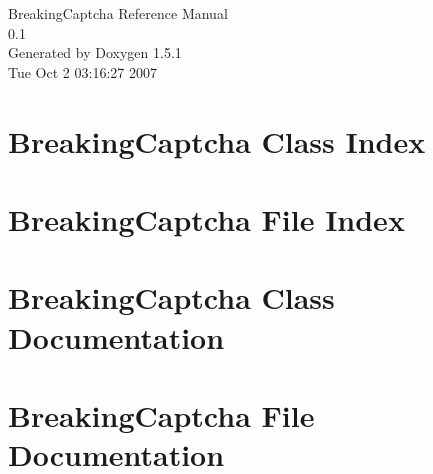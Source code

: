 \documentclass[a4paper]{book}
\begin{document}
\begin{titlepage}
\vspace*{7cm}
\begin{center}
{\Large Breaking\-Captcha Reference Manual\\[1ex]\large 0.1 }\\
\vspace*{1cm}
{\large Generated by Doxygen 1.5.1}\\
\vspace*{0.5cm}
{\small Tue Oct 2 03:16:27 2007}\\
\end{center}
\end{titlepage}
\clearemptydoublepage
{}
\tableofcontents
\clearemptydoublepage
{}
\chapter{Breaking\-Captcha Class Index}

\chapter{Breaking\-Captcha File Index}

\chapter{Breaking\-Captcha Class Documentation}


\chapter{Breaking\-Captcha File Documentation}




\printindex
\end{document}
